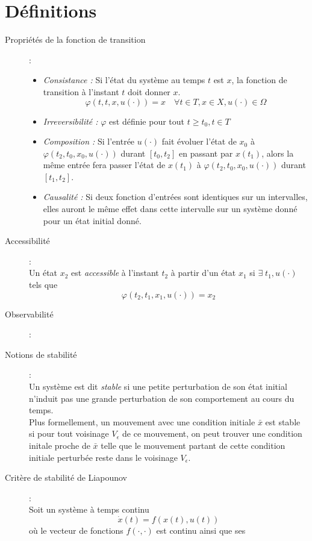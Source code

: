 \documentclass[a4paper]{article}
\begin{document}
\section{Définitions}
\begin{description}
	\item [Propriétés de la fonction de transition]:
		\begin{itemize}
			\item \emph{Consistance :} Si l'état du système au temps $t$ est $x$,
				la fonction de transition à l'instant $t$ doit donner $x$.
				\[\varphi(t,t,x,u(\cdot))=x\quad\forall t\in T, x\in X, u(\cdot)\in\Omega\]
			\item \emph{Irreversibilité :} $\varphi$ est définie pour tout \(t \ge t_0, t\in T\)
			\item \emph{Composition :} Si l'entrée $u(\cdot)$ fait évoluer l'état de $x_0$ à
				$\varphi(t_2,t_0,x_0,u(\cdot))$ durant $[t_0,t_2]$ en passant par $x(t_1)$,
				alors la même entrée fera passer l'état de $x(t_1)$ à $\varphi(t_2,t_0,x_0,u(\cdot))$
				durant $[t_1,t_2]$.
			\item \emph{Causalité :} Si deux fonction d'entrées sont identiques sur un intervalles,
				elles auront le même effet dans cette intervalle sur un système donné pour un état initial donné.
		\end{itemize}
	\item [Accessibilité]:\\
		Un état $x_2$ est \emph{accessible} à l'instant $t_2$ à partir d'un état $x_1$
		si $\exists\;t_1, u(\cdot)$ tels que \[\varphi(t_2,t_1,x_1,u(\cdot))=x_2\]
	\item [Observabilité]:\\
	\item [Notions de stabilité]:\\
		Un système est dit  \emph{stable} si une petite perturbation de son état initial
		n'induit pas une grande perturbation de son comportement au cours du temps.\\
		Plus formellement, un mouvement avec une condition initiale $\bar x$ est
		stable si pour tout voisinage $V_\epsilon$ de ce mouvement, on peut trouver
		une condition initale proche de $\bar x$ telle que le mouvement partant de
		cette condition initiale perturbée reste dans le voisinage $V_\epsilon$.
	\item [Critère de stabilité de Liapounov]:\\
		Soit un système à temps continu
		\[\dot x(t)=f(x(t),u(t))\]
		où le vecteur de fonctions $f(\cdot, \cdot)$ est continu ainsi que ses

\end{description}
\end{document}
